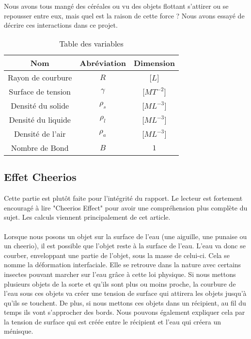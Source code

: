 Nous avons tous mangé des céréales ou vu des objets flottant s'attirer ou se repousser entre eux, mais quel est la raison de cette force ? Nous avons essayé de décrire ces interactions dans ce projet.

\begin{table}
    \centering
    \begin{tabular}{ccc}
        \hline
        Nom                & Abréviation & Dimension\\
        \hline
        Rayon de courbure  & $R$         & [$L$]\\
        Surface de tension & $\gamma$    & [$MT^{-2}$]\\ 
        Densité du solide  & $\rho_s$    & [$ML^{-3}$]\\
        Densité du liquide & $\rho_l$    & [$ML^{-3}$]\\
        Densité de l'air   & $\rho_a$    & [$ML^{-3}$]\\
        Nombre de Bond     & $B$         & $1$\\
        \hline
    \end{tabular}
    \caption{Table des variables}
\end{table}

\subsection{Effet Cheerios}
    \paragraph*{}{
        Cette partie est plutôt faite pour l'intégrité du rapport. Le lecteur est fortement encouragé à lire "Cheerios Effect"\cite{vella_cheerios_2005} pour avoir une compréhension plus complète du sujet. Les calculs viennent principalement de cet article.
    }

    \paragraph*{}{
        Lorsque nous posons un objet sur la surface de l'eau (une aiguille, une punaise ou un cheerio), il est possible que l'objet reste à la surface de l'eau. L'eau va donc se courber, enveloppant une partie de l'objet, sous la masse de celui-ci. Cela se nomme la déformation interfaciale. Elle se retrouve dans la nature avec certains insectes pouvant marcher sur l'eau grâce à cette loi physique. Si nous mettons plusieurs objets de la sorte et qu'ils sont plus ou moins proche, la courbure de l'eau sous ces objets va créer une tension de surface qui attirera les objets jusqu'à qu'ils se touchent. De plus, si nous mettons ces objets dans un récipient, au fil du temps ils vont s'approcher des bords. Nous pouvons également expliquer cela par la tension de surface qui est créée entre le récipient et l'eau qui créera un ménisque.
        }
        
